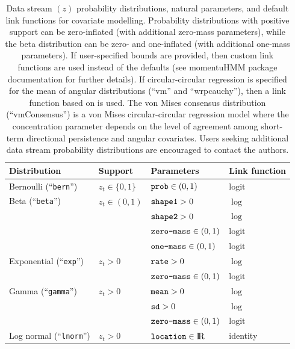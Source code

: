 \documentclass[12pt]{article}\usepackage[]{graphicx}\usepackage[]{color}
\begin{document}
\begin{table}
  \caption{\label{tab:pdfs} Data stream $(z)$ probability distributions, natural parameters, and default link functions for covariate modelling. Probability distributions with positive support can be zero-inflated (with additional zero-mass parameters), while the beta distribution can be zero- and one-inflated (with additional one-mass parameters). If user-specified bounds are provided, then custom link functions are used instead of the defaults (see momentuHMM package documentation for further details). If circular-circular regression is specified for the mean of angular distributions (``vm'' and ``wrpcauchy''), then a link function based on \cite{RivestEtAl2016} is used. The von Mises consensus distribution (``vmConsensus'') is a von Mises circular-circular regression model where the concentration parameter depends on the level of agreement among short-term directional persistence and angular covariates. Users seeking additional data stream probability distributions are encouraged to contact the authors.}
  \begin{tabular}{llll}
  \toprule
  Distribution & Support & Parameters & Link function\footnotemark \tabularnewline
  \midrule
  Bernoulli (``\verb|bern|'')          & $z_t\in\{0,1\}$          & $\verb|prob|\in(0,1)$            &  $\text{logit}$ \tabularnewline  
  Beta (``\verb|beta|'')               & $z_t\in(0,1)$            & $\verb|shape1|>0$                &  $\log$ \tabularnewline  
                                       &                          & $\verb|shape2|>0$                &  $\log$ \tabularnewline
                                       &                          & $\verb|zero-mass|\in(0,1)$       &  $\text{logit}$ \tabularnewline 
                                       &                          & $\verb|one-mass|\in(0,1)$        &  $\text{logit}$ \tabularnewline 
  Exponential (``\verb|exp|'')         & $z_t>0$                  & $\verb|rate|>0$                  &  $\log$ \tabularnewline  
                                       &                          & $\verb|zero-mass|\in(0,1)$       &  $\text{logit}$ \tabularnewline 
  Gamma (``\verb|gamma|'')             & $z_t>0$                  & $\verb|mean|>0$                  &  $\log$ \tabularnewline  
                                       &                          & $\verb|sd|>0$                    &  $\log$ \tabularnewline  
                                       &                          & $\verb|zero-mass|\in(0,1)$       &  $\text{logit}$ \tabularnewline 
  Log normal (``\verb|lnorm|'')        & $z_t>0$                  & $\verb|location|\in{\rm I\!R}$   &  identity \tabularnewline  

\end{tabular}
\end{table}
\end{document}
